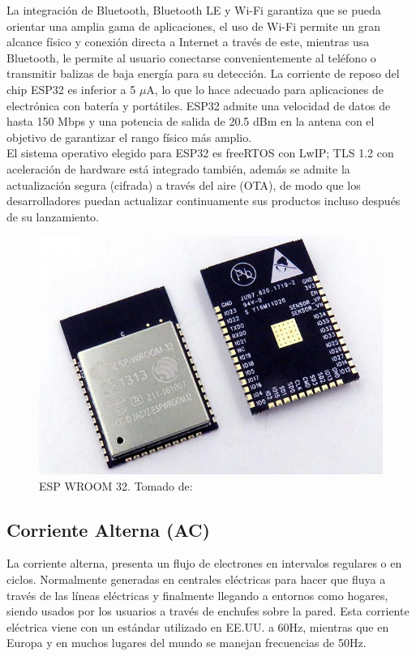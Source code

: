 La integración de Bluetooth, Bluetooth LE y Wi-Fi garantiza que se pueda orientar una amplia gama de aplicaciones, el uso de Wi-Fi permite un gran alcance físico y conexión directa a Internet a través de este, mientras usa Bluetooth, le permite al usuario conectarse convenientemente al teléfono o transmitir balizas de baja energía para su detección. La corriente de reposo del chip ESP32 es inferior a 5 $\mu$A, lo que lo hace adecuado para aplicaciones de electrónica con batería y portátiles. ESP32 admite una velocidad de datos de hasta 150 Mbps y una potencia de salida de 20.5 dBm en la antena con el objetivo de garantizar el rango físico más amplio.\\

El sistema operativo elegido para ESP32 es freeRTOS con LwIP; TLS 1.2 con aceleración de hardware está integrado también, además se admite la actualización segura (cifrada) a través del aire (OTA), de modo que los desarrolladores puedan actualizar continuamente sus productos incluso después de su lanzamiento.\cite{EW32}

\begin{figure}[H]
	\centering
	\caption[ESP WROOM 32.]{ESP WROOM 32. Tomado de: \cite{ESPIMG}}
	\label{fig:esp32-wroom-s32-00}
	\includegraphics{Imagenes/esp32-wroom-s32-00}
\end{figure}

\subsection{Corriente Alterna (AC)}

La corriente alterna, presenta un flujo de electrones en intervalos regulares o en ciclos. Normalmente generadas en centrales eléctricas para hacer que fluya a través de las líneas eléctricas y finalmente llegando a entornos como hogares, siendo usados por los usuarios a través de enchufes sobre la pared. Esta corriente eléctrica viene con un estándar utilizado en EE.UU. a 60Hz, mientras que en Europa y en muchos lugares del mundo se manejan frecuencias de 50Hz. \cite{Cor}

